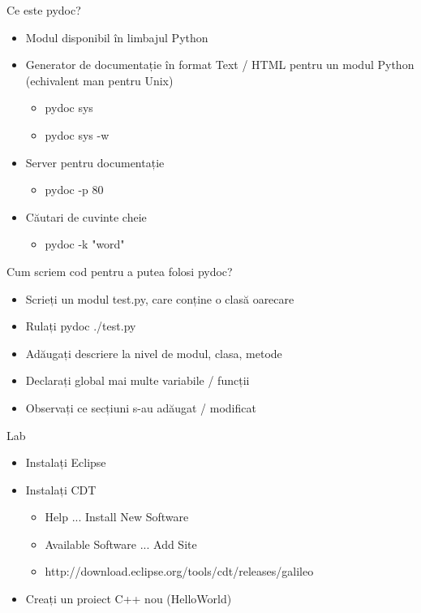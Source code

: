 \documentclass{beamer}
\begin{document}
\begin{frame}{Ce este pydoc?}
  \begin{itemize}
  \item Modul disponibil în limbajul Python
  \pause
  \item Generator de documentație în format Text / HTML pentru un modul Python
  (echivalent man pentru Unix)
  \pause
    \begin{itemize}
    \item pydoc sys
    \pause
    \item pydoc sys -w
    \end{itemize}
  \pause
  \item Server pentru documentație
    \begin{itemize}
      \item pydoc -p 80
    \end{itemize}
  \pause
  \item Căutari de cuvinte cheie
    \begin{itemize}
      \item pydoc -k "word"
    \end{itemize}
  \end{itemize}
\end{frame}

\begin{frame}{Cum scriem cod pentru a putea folosi pydoc?}
  \begin{itemize}
  \item Scrieți un modul test.py, care conține o clasă oarecare
  \item Rulați pydoc ./test.py
  \item Adăugați descriere la nivel de modul, clasa, metode
  \item Declarați global mai multe variabile / funcții
  \item Observați ce secțiuni s-au adăugat / modificat
  \end{itemize}
\end{frame}

\begin{frame}{Lab}
  \begin{itemize}
  \item Instalați Eclipse
  \pause
  \item Instalați CDT
		\begin{itemize} 
		\pause
	  \item Help ... Install New Software
  	\pause
	  \item Available Software ... Add Site
  	\item http://download.eclipse.org/tools/cdt/releases/galileo
  	\end{itemize}
  \item Creați un proiect C++ nou (HelloWorld)
  \end{itemize}
\end{frame}
\end{document}

